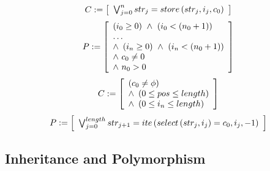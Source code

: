 \documentclass[a4paper]{llncs}
\begin{document}
\begin{equation}
\label{cconstructor-string}
C := \left [ \begin{array}{ll} 
                \bigvee^{n}_{j=0} str_{j} = store\left(str_{j}, i_{j}, c_{0}\right) 
              \end{array} \right ]  \\ 
\end{equation}
%
\begin{equation}
\label{pconstructor-string}
P := \left [ \begin{array}{ll} 
                \left(i_{0} \geq 0\right)  \, \, \wedge \, \, \left(i_{0} < \left(n_{0} + 1\right)\right)\\
                \ldots \\
                \wedge \, \, \left(i_{n} \geq 0\right)  \, \, \wedge \, \, \left(i_{n} < \left(n_{0} + 1\right)\right)\\
                \wedge \, \, c_{0} \neq 0\\
                \wedge \, \, n_{0} > 0\\
              \end{array} \right ]  \\ 
\end{equation}
%
\begin{equation}
\label{cfind-string}
C := \left [ \begin{array}{ll} 
                \left(c_{0} \neq \phi\right)\\
                \wedge \, \, \left(0 \leq pos \leq length\right)\\
                \wedge \, \, \left(0 \leq i_{n} \leq length\right)\\
              \end{array} \right ]  \\ 
\end{equation}
%
\begin{equation}
\label{pfind-string}
P := \left [ \begin{array}{ll} 
                \bigvee^{length}_{j=0} str_{j+1} = ite\left(select\left(str_{j}, i_{j}\right) = c_{0}, i_{j}, -1\right)
              \end{array} \right ]  \\ 
\end{equation}

\subsection{Inheritance and Polymorphism}
\end{document}
